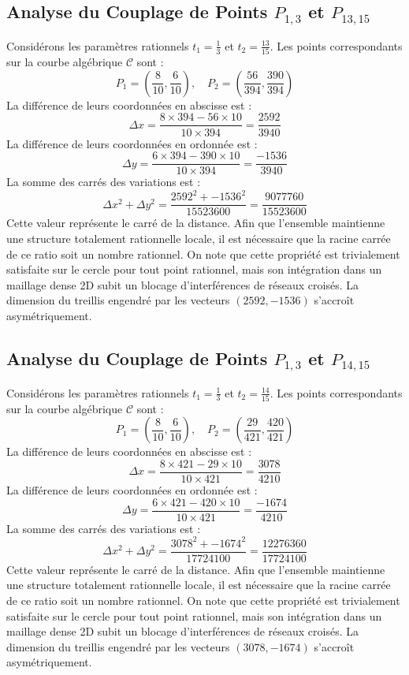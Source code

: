 \documentclass[12pt, a4paper]{article}
\begin{document}
\subsection{Analyse du Couplage de Points $P_{1,3}$ et $P_{13,15}$}
Considérons les paramètres rationnels $t_1 = \frac{1}{3}$ et $t_2 = \frac{13}{15}$.
Les points correspondants sur la courbe algébrique $\mathcal{C}$ sont :
$$ P_1 = \left( \frac{8}{10}, \frac{6}{10} \right), \quad P_2 = \left( \frac{56}{394}, \frac{390}{394} \right) $$
La différence de leurs coordonnées en abscisse est :
$$ \Delta x = \frac{8 \times 394 - 56 \times 10}{10 \times 394} = \frac{2592}{3940} $$
La différence de leurs coordonnées en ordonnée est :
$$ \Delta y = \frac{6 \times 394 - 390 \times 10}{10 \times 394} = \frac{-1536}{3940} $$
La somme des carrés des variations est :
$$ \Delta x^2 + \Delta y^2 = \frac{ 2592^2 + -1536^2 }{ 15523600 } = \frac{ 9077760 }{ 15523600 } $$
Cette valeur représente le carré de la distance. Afin que l'ensemble maintienne une structure totalement rationnelle locale, il est nécessaire que la racine carrée de ce ratio soit un nombre rationnel. On note que cette propriété est trivialement satisfaite sur le cercle pour tout point rationnel, mais son intégration dans un maillage dense 2D subit un blocage d'interférences de réseaux croisés. La dimension du treillis engendré par les vecteurs $( 2592, -1536 )$ s'accroît asymétriquement.


\subsection{Analyse du Couplage de Points $P_{1,3}$ et $P_{14,15}$}
Considérons les paramètres rationnels $t_1 = \frac{1}{3}$ et $t_2 = \frac{14}{15}$.
Les points correspondants sur la courbe algébrique $\mathcal{C}$ sont :
$$ P_1 = \left( \frac{8}{10}, \frac{6}{10} \right), \quad P_2 = \left( \frac{29}{421}, \frac{420}{421} \right) $$
La différence de leurs coordonnées en abscisse est :
$$ \Delta x = \frac{8 \times 421 - 29 \times 10}{10 \times 421} = \frac{3078}{4210} $$
La différence de leurs coordonnées en ordonnée est :
$$ \Delta y = \frac{6 \times 421 - 420 \times 10}{10 \times 421} = \frac{-1674}{4210} $$
La somme des carrés des variations est :
$$ \Delta x^2 + \Delta y^2 = \frac{ 3078^2 + -1674^2 }{ 17724100 } = \frac{ 12276360 }{ 17724100 } $$
Cette valeur représente le carré de la distance. Afin que l'ensemble maintienne une structure totalement rationnelle locale, il est nécessaire que la racine carrée de ce ratio soit un nombre rationnel. On note que cette propriété est trivialement satisfaite sur le cercle pour tout point rationnel, mais son intégration dans un maillage dense 2D subit un blocage d'interférences de réseaux croisés. La dimension du treillis engendré par les vecteurs $( 3078, -1674 )$ s'accroît asymétriquement.
\end{document}
